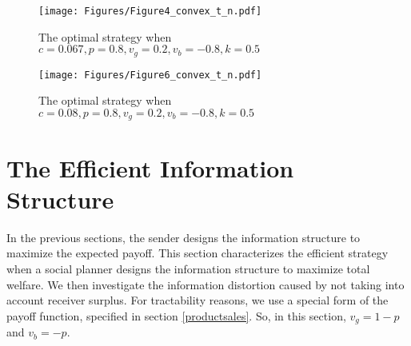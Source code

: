 \documentclass[11pt]{extarticle}
\begin{document}
\begin{figure}[H]
	\centering
	\texttt{[image: Figures/Figure4\_convex\_t\_n.pdf]}
	\caption{The optimal strategy when $c = 0.067, p = 0.8, v_g = 0.2, v_b = -0.8, k = 0.5$}\label{ci1}
\end{figure}

\begin{figure}[H]
	\centering
	\texttt{[image: Figures/Figure6\_convex\_t\_n.pdf]}
	\caption{The optimal strategy when $c = 0.08, p = 0.8, v_g = 0.2, v_b = -0.8, k = 0.5$}\label{ch}
\end{figure}



\section{The Efficient Information Structure}
In the previous sections, the sender designs the information structure to maximize the expected payoff. This section characterizes the efficient strategy when a social planner designs the information structure to maximize total welfare. We then investigate the information distortion caused by not taking into account receiver surplus. For tractability reasons, we use a special form of the payoff function, specified in section \ref{productsales}. So, in this section, $v_g = 1-p$ and $v_b = - p$.
\end{document}
